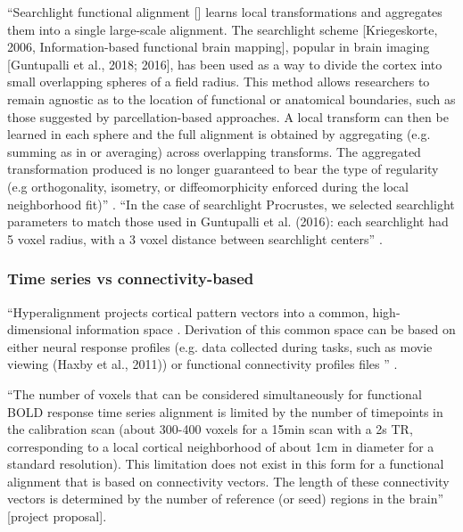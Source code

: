 ``Searchlight functional alignment [\citep{zhang2016searchlight,
guntupalli2016model}] learns local transformations and aggregates them into a
single large-scale alignment.
%
The searchlight scheme [Kriegeskorte, 2006, Information-based functional brain
mapping], popular in brain imaging [Guntupalli et al., 2018; 2016], has been
used as a way to divide the cortex into small overlapping spheres of a field
radius.
%
This method allows researchers to remain agnostic as to the location of
functional or anatomical boundaries, such as those suggested by
parcellation-based approaches.
%
A local transform can then be learned in each sphere and the full alignment is
obtained by aggregating (e.g. summing as in \citep{guntupalli2016model} or
averaging) across overlapping transforms.
%
The aggregated transformation produced is no longer guaranteed to bear the type
of regularity (e.g orthogonality, isometry, or diffeomorphicity enforced during
the local neighborhood fit)'' \citep{bazeille2021empirical}.
%
``In the case of searchlight Procrustes, we selected searchlight parameters to
match those used in Guntupalli et al. (2016):
%
each searchlight had 5 voxel radius, with a 3 voxel distance between searchlight
centers'' \citep{bazeille2021empirical}.


\subsubsection{Time series vs connectivity-based}




``Hyperalignment projects cortical pattern vectors into a common,
high-dimensional information space \citep{haxby2020hyperalignment}.
%
Derivation of this common space can be based on either neural response profiles
(e.g. data collected during tasks, such as movie viewing (Haxby et al., 2011))
or functional connectivity profiles files \citep{guntupalli2018computational}''
\citep{busch2021hybrid}.

``The number of voxels that can be considered simultaneously for functional BOLD
response time series alignment is limited by the number of timepoints in the
calibration scan (about 300-400 voxels for a 15min scan with a 2s TR,
corresponding to a local cortical neighborhood of about 1cm in diameter for a
standard resolution).
%
This limitation does not exist in this form for a functional alignment that is
based on connectivity vectors.
%
The length of these connectivity vectors is determined by the number of
reference (or seed) regions in the brain'' [project proposal].



